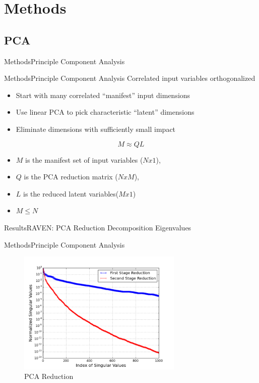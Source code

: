 \documentclass{beamer}
\begin{document}
\section{Methods}
\subsection{PCA}
\begin{frame}{Methods}{Principle Component Analysis}
\end{frame}

\begin{frame}{Methods}{Principle Component Analysis}
  \vfill
  Correlated input variables orthogonalized
  \vfill
  \begin{itemize}
    \item Start with many correlated ``manifest'' input dimensions
  \vfill
    \item Use linear PCA to pick characteristic ``latent'' dimensions
  \vfill
    \item Eliminate dimensions with sufficiently small impact
  \end{itemize}
  \vfill
  \begin{equation}
    M \approx Q L \nonumber
  \end{equation}
  \begin{itemize}
    \item $M$ is the manifest set of input variables ($Nx1$),
    \item $Q$ is the PCA reduction matrix ($NxM$),
    \item $L$ is the reduced latent variables($Mx1$)
    \item $M \leq N$
  \end{itemize}
  \vfill
\end{frame}

\begin{frame}{Results}{RAVEN: PCA Reduction}
\vfill
  Decomposition Eigenvalues
  
\vfill
\end{frame}

\begin{frame}{Methods}{Principle Component Analysis}
  \begin{figure}[h!]
    \centering
      \includegraphics[width=0.7\textwidth]{graphics/PCA_1_2}
      \caption{PCA Reduction}
  \end{figure}
\end{frame}
\end{document}
